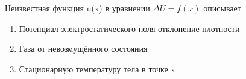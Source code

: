 Неизвестная функция u(x) в уравнении \(\Delta U=f(x )\) описывает

\begin{enumerate}[label=\arabic*)]
    \item Потенциал электростатического поля отклонение плотности
    \item Газа от невозмущённого состояния
    \item Стационарную температуру тела в точке x
\end{enumerate}

